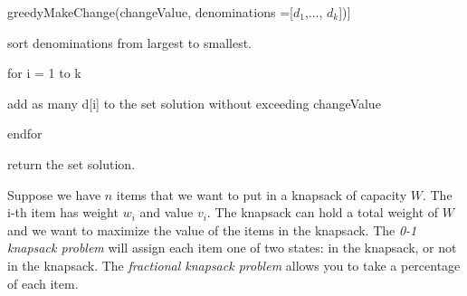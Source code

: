 \documentclass{article}
\begin{document}
greedyMakeChange(changeValue, denominations ={[$d_1$,..., $d_k$]})]

sort denominations from largest to smallest.
 
for i = 1 to k

\quad 	add as many d{[i]} to the set solution without exceeding changeValue

endfor

return the set solution.




\nextprob
Suppose we have $n$ items that we want to put in a knapsack of capacity $W$.  The i-th item has
weight $w_i$ and value $v_i$.  The knapsack can hold a total weight of $W$ and
we want to maximize the value of the items in the knapsack.
The \emph{0-1 knapsack problem} will assign each item one of two states: in the
knapsack, or not in the knapsack.  The \emph{fractional knapsack problem} allows
you to take a percentage of each item.
\end{document}
